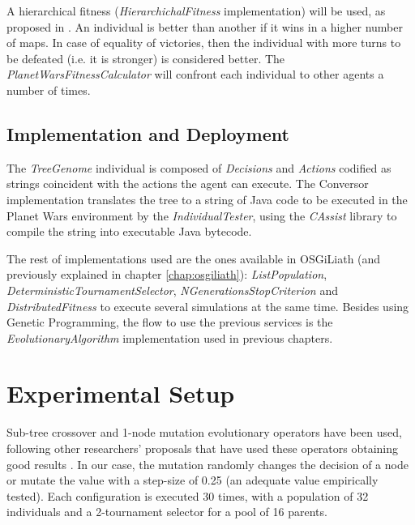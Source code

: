 
A hierarchical fitness ({\em HierarchichalFitness} implementation) will be used, as proposed in \cite{Mora2012Genebot}. An individual is better than another if it wins in a higher number of maps. In case of equality of victories, then the individual with more turns to be defeated (i.e. it is stronger) is considered better. The {\em PlanetWarsFitnessCalculator} will confront each individual to other agents a number of times.

\subsection{Implementation and Deployment}

The {\em TreeGenome} individual is composed of {\em Decisions} and {\em Actions} codified as strings coincident with the actions the agent can execute. The {Conversor} implementation translates the tree to a string of Java code to be executed in the Planet Wars environment by the {\em IndividualTester}, using the {\em CAssist} library to compile the string into executable Java bytecode.

The rest of implementations used are the ones available in OSGiLiath (and previously explained in chapter \ref{chap:osgiliath}): {\em ListPopulation}, {\em DeterministicTournamentSelector}, {\em NGenerationsStopCriterion} and {\em DistributedFitness} to execute several simulations at the same time. Besides using Genetic Programming, the flow to use the previous services is the {\em EvolutionaryAlgorithm} implementation used in previous chapters.



\section{Experimental Setup}
\label{sec:experiments}

Sub-tree crossover and 1-node mutation evolutionary operators have been used, following other researchers' proposals that have used these operators obtaining good results \cite{Esparcia2013GPunreal}. In our case, the mutation randomly changes the decision of a node or mutate the value with a step-size of 0.25 (an adequate value empirically tested). Each configuration is executed 30 times, with a population of 32 individuals and a 2-tournament selector for a pool of 16 parents.


